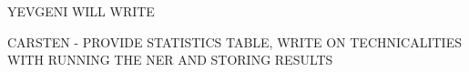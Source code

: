 
YEVGENI WILL WRITE

CARSTEN - PROVIDE STATISTICS TABLE, WRITE ON TECHNICALITIES WITH RUNNING THE NER AND STORING RESULTS



